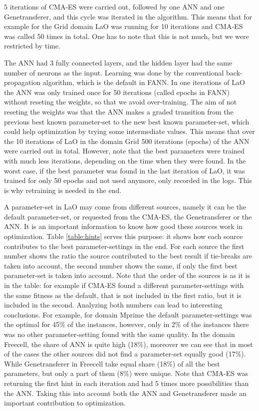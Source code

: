 \documentclass{acm_proc_article-sp}
\begin{document}
5 iterations of CMA-ES were carried out, followed by one ANN and one Genetransferer, and this cycle was iterated in the algorithm. This means that for example for the Grid domain LaO was running for 10 iterations and CMA-ES was called 50 times in total. One has to note that this is not much, but we were restricted by time.

The ANN had 3 fully connected layers, and the hidden layer had the same number of neurons as the input. Learning was done by the conventional back-propagation algorithm, which is the default in FANN. In one iterations of LaO the ANN was only trained once for 50 iterations (called epochs in FANN) without reseting the weights, so that we avoid over-training. The aim of not reseting the weights was that the ANN makes a graded transition from the previous best known parameter-set to the new best known parameter-set, which could help optimization by trying some intermediate values. This means that over the 10 iterations of LaO in the domain Grid 500 iterations (epochs) of the ANN were carried out in total. However, note that the best parameters were trained with much less iterations, depending on the time when they were found. In the worst case, if the best parameter was found in the last iteration of LaO, it was trained for only 50 epochs and not used anymore, only recorded in the logs. This is why retraining is needed in the end.

A parameter-set in LaO may come from different sources, namely it can be the default parameter-set, or requested from the CMA-ES, the Genetransferer or the ANN. It is an important information to know how good these sources work in optimization. Table \ref{table:hints} serves this purpose: it shows how each source contributes to the best parameter-settings in the end. For each source the first number shows the ratio the source contributed to the best result if tie-breaks are taken into account, the second number shows the same, if only the first best parameter-set is taken into account. Note that the order of the sources is as it is in the table: for example if CMA-ES found a different parameter-settings with the same fitness as the default, that is not included in the first ratio, but it is included in the second. Analyzing both numbers can lead to interesting conclusions. For example, for domain Mprime the default parameter-settings was the optimal for 45\% of the instances, however, only in 2\% of the instances there was no other parameter-setting found with the same quality. In the domain Freecell, the share of ANN is quite high (18\%), moreover we can see that in most of the cases the other sources did not find a parameter-set equally good (17\%). While Genetransferer in Freecell take equal share (18\%) of all the best parameters, but only a part of them (8\%) were unique. Note that CMA-ES was returning the first hint in each iteration and had 5 times more possibilities than the ANN. Taking this into account both the ANN and Genetransferer made an important contribution to optimization.
\end{document}
